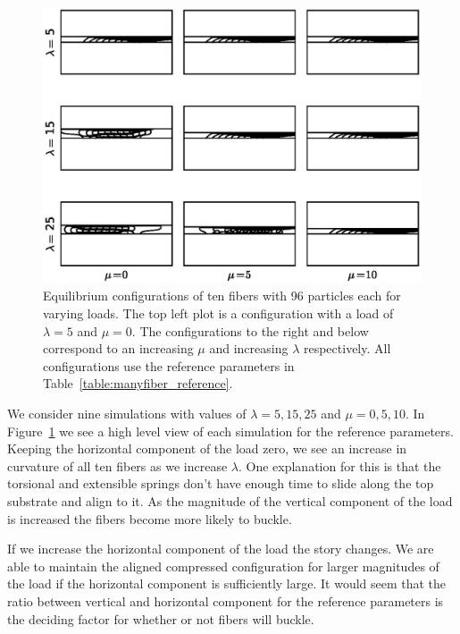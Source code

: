 	\begin{figure}
		\begin{center}
			\includegraphics[scale=1]{./fig/ch4/grid.eps}
		\end{center}		
		\caption{Equilibrium configurations of ten fibers with 96 particles each for varying loads. The top left plot is a configuration with a load of $\lambda = 5$ and $\mu = 0$. The configurations to the right and below correspond to an increasing $\mu$ and increasing $\lambda$ respectively. All configurations use the reference parameters in Table~\ref{table:manyfiber_reference}.
		\label{fig:grid}}
	\end{figure}
	
	We consider nine simulations with values of $\lambda = 5, 15, 25$ and $\mu = 0, 5, 10$. In Figure~\ref{fig:grid} we see a high level view of each simulation for the reference parameters. Keeping the horizontal component of the load zero, we see an increase in curvature of all ten fibers as we increase $\lambda$. One explanation for this is that the torsional and extensible springs don't have enough time to slide along the top substrate and align to it. As the magnitude of the vertical component of the load is increased the fibers become more likely to buckle. 
	
	If we increase the horizontal component of the load the story changes. We are able to maintain the aligned compressed configuration for larger magnitudes of the load if the horizontal component is sufficiently large. It would seem that the ratio between vertical and horizontal component for the reference parameters is the deciding factor for whether or not fibers will buckle.

